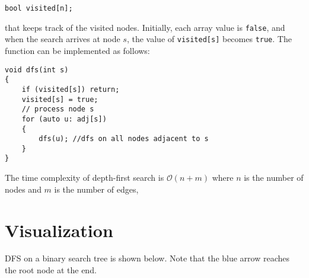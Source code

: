 \documentclass[twoside,12pt,a4paper,english]{book}
\theoremstyle{definition}
\theoremstyle{problemstyle}
\begin{document}
\begin{lstlisting}
bool visited[n];
\end{lstlisting}

that keeps track of the visited nodes. Initially, each array value is \texttt{false}, and
when the search arrives at node $s$, the value of \texttt{visited[s]} becomes \texttt{true}. The function can be implemented as follows:
\newpage

\begin{lstlisting}
void dfs(int s) 
{
    if (visited[s]) return;
    visited[s] = true;
    // process node s
    for (auto u: adj[s]) 
    {
        dfs(u); //dfs on all nodes adjacent to s
    }
}
\end{lstlisting}

The time complexity of depth-first search is $\mathcal{O}(n+m)$
where $n$ is the number of nodes and $m$ is the
number of edges,

\section{Visualization}

DFS on a binary search tree is shown below. Note that the blue arrow reaches the root node at the end.
\end{document}
